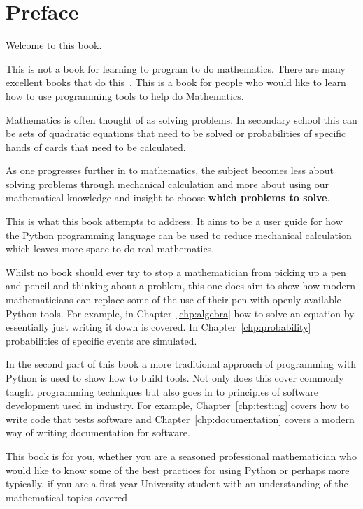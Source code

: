 \chapter*{Preface}


Welcome to this book.

This is not a book for learning to program to do mathematics. There are
many excellent books that do this~\cite{bautista2014mathematics, morley2022applying,  saha2015doing}. This is a book for people who would
like to learn how to use programming tools to help do Mathematics.

Mathematics is often thought of as solving problems. In secondary school this can
be sets of quadratic equations that need to be solved or probabilities of
specific hands of cards that need to be calculated.

As one progresses further in to mathematics, the subject becomes less about
solving problems through mechanical calculation and more about using our
mathematical knowledge and insight to choose \textbf{which problems to solve}.

This is what this book attempts to address. It aims to be a user guide for how
the Python programming language can be used to reduce mechanical calculation
which leaves more space to do real mathematics.

Whilst no book should ever try to stop a mathematician from picking up a pen and
pencil and thinking about a problem, this one does aim to show how modern
mathematicians can replace some of the use of their pen with openly available
Python tools. For example, in Chapter~\ref{chp:algebra} how to solve an equation by essentially
just writing it down is covered. In Chapter~\ref{chp:probability} probabilities
of specific events are simulated.

In the second part of this book a more traditional approach of programming with
Python is used to show how to build tools. Not only does this cover commonly
taught programming techniques but also goes in to principles of software
development used in industry. For example, Chapter~\ref{chp:testing} covers how
to write code that tests software and Chapter~\ref{chp:documentation} covers a
modern way of writing documentation for software.

This book is for you, whether you are a seasoned professional mathematician who
would like to know some of the best practices for using Python or perhaps more
typically, if you are a first year University student with an understanding of
the mathematical topics covered

